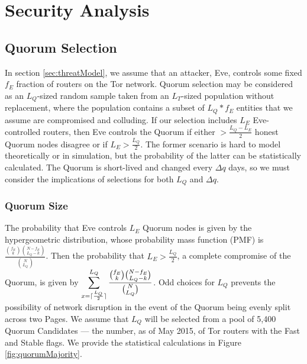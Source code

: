 \documentclass{sig-alternate}
\DeclarePairedDelimiter{\ceil}{\lceil}{\rceil}
\begin{document}



\section{Security Analysis}
\label{sec:Analysis}

\subsection{Quorum Selection}


In section \ref{sec:threatModel}, we assume that an attacker, Eve, controls some fixed $ f_{E} $ fraction of routers on the Tor network. Quorum selection may be considered as an $ L_{Q} $-sized random sample taken from an $ L_{T} $-sized population without replacement, where the population contains a subset of $ L_{Q} * f_{E} $ entities that we assume are compromised and colluding. If our selection includes $ L_{E} $ Eve-controlled routers, then Eve controls the Quorum if either $ > \frac{L_{Q} - L_{E}}{2} $ honest Quorum nodes disagree or if $ L_{E} > \frac{L_{Q}}{2} $. The former scenario is hard to model theoretically or in simulation, but the probability of the latter can be statistically calculated. The Quorum is short-lived and changed every $ \Delta q $ days, so we must consider the implications of selections for both $ L_{Q} $ and $ \Delta q $.

\subsubsection{Quorum Size}

The probability that Eve controls $ L_{E} $ Quorum nodes is given by the hypergeometric distribution, whose probability mass function (PMF) is $ \frac{\binom{f_{E}}{k}\binom{N - f_{E}}{L_{Q} - k}}{\binom{N}{L_{Q}}} $. Then the probability that $ L_{E} > \frac{L_{Q}}{2} $, a complete compromise of the Quorum, is given by $ \displaystyle\sum_{x=\ceil{\frac{L_{Q}}{2}}}^{L_{Q}} \frac{\binom{f_{E}}{k}\binom{N - f_{E}}{L_{Q} - k}}{\binom{N}{L_{Q}}} $. Odd choices for $ L_{Q} $ prevents the possibility of network disruption in the event of the Quorum being evenly split across two Pages. We assume that $ L_{Q} $ will be selected from a pool of 5,400 Quorum Candidates --- the number, as of May 2015, of Tor routers with the Fast and Stable flags. We provide the statistical calculations in Figure \ref{fig:quorumMajority}.
\end{document}
